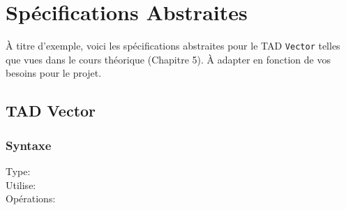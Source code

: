 \section{Spécifications Abstraites}\label{tad}
À titre d'exemple, voici les spécifications abstraites pour le TAD \texttt{Vector} telles que vues dans le cours théorique (Chapitre 5).  À adapter en fonction de vos besoins pour le projet.




\subsection{TAD Vector}
\subsubsection{Syntaxe}
\begin{description}
  \item[Type:]
  \item[Utilise:]
  \item[Opérations:]
\end{description}

